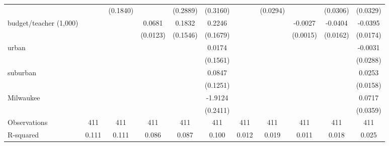 {\begin{tabular}{l*{10}{c}}
                    &                     &    (0.1840)         &                     &    (0.2889)         &    (0.3160)         &                     &    (0.0294)         &                     &    (0.0306)         &    (0.0329)         \\
[1em]
budget/teacher (1,000)&                     &                     &      0.0681\sym{***}&      0.1832         &      0.2246         &                     &                     &     -0.0027\sym{*}  &     -0.0404\sym{**} &     -0.0395\sym{**} \\
                    &                     &                     &    (0.0123)         &    (0.1546)         &    (0.1679)         &                     &                     &    (0.0015)         &    (0.0162)         &    (0.0174)         \\
[1em]
urban               &                     &                     &                     &                     &      0.0174         &                     &                     &                     &                     &     -0.0031         \\
                    &                     &                     &                     &                     &    (0.1561)         &                     &                     &                     &                     &    (0.0288)         \\
[1em]
suburban            &                     &                     &                     &                     &      0.0847         &                     &                     &                     &                     &      0.0253         \\
                    &                     &                     &                     &                     &    (0.1251)         &                     &                     &                     &                     &    (0.0158)         \\
[1em]
Milwaukee           &                     &                     &                     &                     &     -1.9124\sym{***}&                     &                     &                     &                     &      0.0717\sym{**} \\
                    &                     &                     &                     &                     &    (0.2411)         &                     &                     &                     &                     &    (0.0359)         \\
\hline
Observations        &         411         &         411         &         411         &         411         &         411         &         411         &         411         &         411         &         411         &         411         \\
R-squared           &       0.111         &       0.111         &       0.086         &       0.087         &       0.100         &       0.012         &       0.019         &       0.011         &       0.018         &       0.025         \\
\hline\hline
\end{tabular}
}
